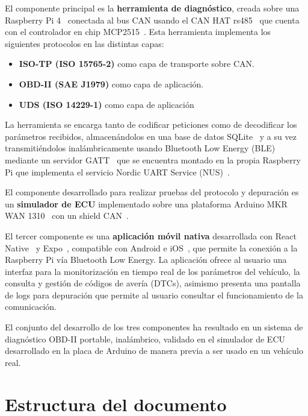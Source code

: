 El componente principal es la \textbf{herramienta de diagnóstico}, creada sobre una Raspberry Pi 4~\cite{RaspberryPi4_datasheet} conectada al bus CAN usando el CAN HAT rs485~\cite{Waveshare_RS485CANHAT} que cuenta con el controlador en chip MCP2515~\cite{Microchip_MCP2515}. Esta herramienta implementa los siguientes protocolos en las distintas capas:
\begin{itemize}
    \item \textbf{ISO-TP (ISO 15765-2)} como capa de transporte sobre CAN.
    \item \textbf{OBD-II (SAE J1979)} como capa de aplicación.
    \item \textbf{UDS  (ISO 14229-1)} como capa de aplicación
\end{itemize}

La herramienta se encarga tanto de codificar peticiones como de decodificar los parámetros recibidos, almacenándolos en una base de datos SQLite~\cite{SQLite} y a su vez transmitiéndolos inalámbricamente usando Bluetooth Low Energy (BLE) mediante un servidor GATT~\cite{Bluetooth_CoreSpec} que se encuentra montado en la propia Raspberry Pi que implementa el servicio Nordic UART Service (NUS)~\cite{Nordic_NUS}.

El componente desarrollado para realizar pruebas del protocolo y depuración es un \textbf{simulador de ECU} implementado sobre una plataforma Arduino MKR WAN 1310~\cite{Arduino_MKRWAN1310} con un shield CAN~\cite{Arduino_MKRCAN}.

El tercer componente es una \textbf{aplicación móvil nativa} desarrollada con React Native~\cite{ReactNative} y Expo~\cite{Expo_docs}, compatible con Android e iOS~\cite{Android,iOS}, que permite la conexión a la Raspberry Pi vía Bluetooth Low Energy. La aplicación ofrece al usuario una interfaz para la monitorización en tiempo real de los parámetros del vehículo, la consulta y gestión de códigos de avería (DTCs), asimismo presenta una pantalla de logs para depuración que permite al usuario consultar el funcionamiento de la comunicación.

El conjunto del desarrollo de los tres componentes ha resultado en un sistema de diagnóstico OBD-II portable, inalámbrico, validado en el simulador de ECU desarrollado en la placa de Arduino de manera previa a ser usado en un vehículo real.

\section{Estructura del documento}


